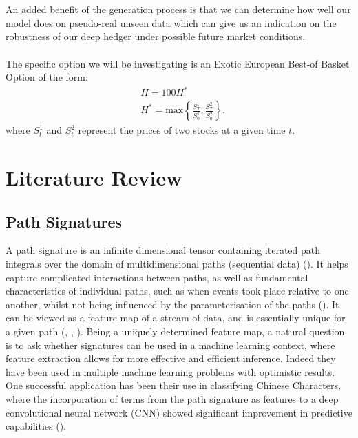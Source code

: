 \documentclass{article}
\theoremstyle{definition}
\begin{document}
\\\\
An added benefit of the generation process is that we can determine how well our model does on pseudo-real unseen data which can give us an indication on the robustness of our deep hedger under possible future market conditions.
\\\\
The specific option we will be investigating is an Exotic European Best-of Basket Option of the form:
\label{our option}
\begin{align}
    &H = 100H^*\\
    &H^* = \text{max}\left\{\frac{S^{1}_{T}}{S^{1}_{0}}, \frac{S^{2}_{T}}{S^{2}_{0}}\right\}.
\end{align}
where $S_t^1$ and $S_t^2$ represent the prices of two stocks at a given time $t$.
\newpage

\section{Literature Review}
\subsection{Path Signatures}
A path signature is an infinite dimensional tensor containing iterated path integrals over the domain of multidimensional paths (sequential data) (\cite{chevyrev2016primer}). It helps capture complicated interactions between paths, as well as fundamental characteristics of individual paths, such as when events took place relative to one another, whilst not being influenced by the parameterisation of the paths (\cite{lyons2023signature}).
It can be viewed as a feature map of a stream of data, and is essentially unique for a given path (\cite{lyons2023signature}, \cite{boedihardjo2013uniqueness}, \cite{boedihardjo2014signature}).
Being a uniquely determined feature map, a natural question is to ask whether signatures can be used in a machine learning context, where feature extraction allows for more effective and efficient inference.
Indeed they have been used in multiple machine learning problems with optimistic results. One successful application has been their use in classifying Chinese Characters, where the incorporation of terms from the path signature as features to a deep convolutional neural network (CNN) showed significant improvement in predictive capabilities (\cite{chinesecharacters}).
\end{document}
